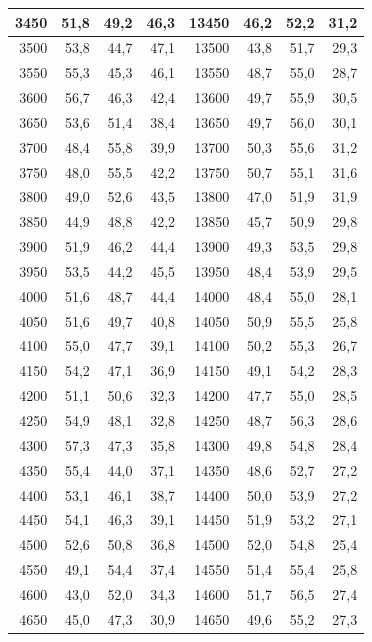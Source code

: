 \begin{small}
\begin{longtable}{|r|r|r|r|r|r|r|r|}
3450 & 51,8 & 49,2 & 46,3 & 13450 & 46,2 & 52,2 & 31,2 \\ \hline
3500 & 53,8 & 44,7 & 47,1 & 13500 & 43,8 & 51,7 & 29,3 \\ \hline
3550 & 55,3 & 45,3 & 46,1 & 13550 & 48,7 & 55,0 & 28,7 \\ \hline
3600 & 56,7 & 46,3 & 42,4 & 13600 & 49,7 & 55,9 & 30,5 \\ \hline
3650 & 53,6 & 51,4 & 38,4 & 13650 & 49,7 & 56,0 & 30,1 \\ \hline
3700 & 48,4 & 55,8 & 39,9 & 13700 & 50,3 & 55,6 & 31,2 \\ \hline
3750 & 48,0 & 55,5 & 42,2 & 13750 & 50,7 & 55,1 & 31,6 \\ \hline
3800 & 49,0 & 52,6 & 43,5 & 13800 & 47,0 & 51,9 & 31,9 \\ \hline
3850 & 44,9 & 48,8 & 42,2 & 13850 & 45,7 & 50,9 & 29,8 \\ \hline
3900 & 51,9 & 46,2 & 44,4 & 13900 & 49,3 & 53,5 & 29,8 \\ \hline
3950 & 53,5 & 44,2 & 45,5 & 13950 & 48,4 & 53,9 & 29,5 \\ \hline
4000 & 51,6 & 48,7 & 44,4 & 14000 & 48,4 & 55,0 & 28,1 \\ \hline
4050 & 51,6 & 49,7 & 40,8 & 14050 & 50,9 & 55,5 & 25,8 \\ \hline
4100 & 55,0 & 47,7 & 39,1 & 14100 & 50,2 & 55,3 & 26,7 \\ \hline
4150 & 54,2 & 47,1 & 36,9 & 14150 & 49,1 & 54,2 & 28,3 \\ \hline
4200 & 51,1 & 50,6 & 32,3 & 14200 & 47,7 & 55,0 & 28,5 \\ \hline
4250 & 54,9 & 48,1 & 32,8 & 14250 & 48,7 & 56,3 & 28,6 \\ \hline
4300 & 57,3 & 47,3 & 35,8 & 14300 & 49,8 & 54,8 & 28,4 \\ \hline
4350 & 55,4 & 44,0 & 37,1 & 14350 & 48,6 & 52,7 & 27,2 \\ \hline
4400 & 53,1 & 46,1 & 38,7 & 14400 & 50,0 & 53,9 & 27,2 \\ \hline
4450 & 54,1 & 46,3 & 39,1 & 14450 & 51,9 & 53,2 & 27,1 \\ \hline
4500 & 52,6 & 50,8 & 36,8 & 14500 & 52,0 & 54,8 & 25,4 \\ \hline
4550 & 49,1 & 54,4 & 37,4 & 14550 & 51,4 & 55,4 & 25,8 \\ \hline
4600 & 43,0 & 52,0 & 34,3 & 14600 & 51,7 & 56,5 & 27,4 \\ \hline
4650 & 45,0 & 47,3 & 30,9 & 14650 & 49,6 & 55,2 & 27,3 \\ \hline

\end{longtable}
\end{small}
